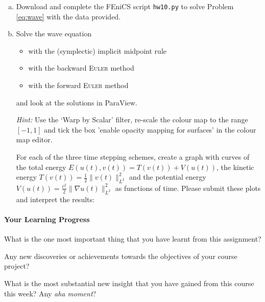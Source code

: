 \begin{enumerate}[(a)]
\item %
Download and complete the \textsf{FEniCS} script \texttt{hw10.py} to solve Problem \eqref{eq:wave} with the data provided.
\item %
Solve the wave equation
\begin{itemize}
\item with the (symplectic) implicit midpoint rule
\item with the backward \textsc{Euler} method
\item with the forward \textsc{Euler} method
\end{itemize}
and look at the solutions in \textsf{ParaView}.

\emph{Hint:} Use the `Warp by Scalar' filter, re-scale the colour map to the range $[-1,1]$ and tick the box 'enable opacity mapping for surfaces' in the colour map editor.

For each of the three time stepping schemes, create a graph with curves of the total energy $E(u(t),v(t)) = T(v(t)) + V(u(t))$, the kinetic energy $T(v(t)) = \frac{1}{2}\lVert v(t) \rVert_{L^2}^2$ and the potential energy $V(u(t)) = \frac{c^2}{2}\lVert \nabla u(t) \rVert_{L^2}^2$ as functions of time. Please submit these plots and interpret the results:
\end{enumerate}

\vspace{0.5cm}
\begin{solution}
\end{solution}

\vfill
\paragraph*{Your Learning Progress}%

What is the one most important thing that you have learnt from this assignment?

\vspace*{3mm}
\hrulefill

\vspace*{3mm}
\hrulefill

Any new discoveries or achievements towards the objectives of your course project?

\vspace*{3mm}
\hrulefill

\vspace*{3mm}
\hrulefill

What is the most substantial new insight that you have gained from this course this week? Any \emph{aha moment}?

\vspace*{3mm}
\hrulefill

\vspace*{3mm}
\hrulefill


